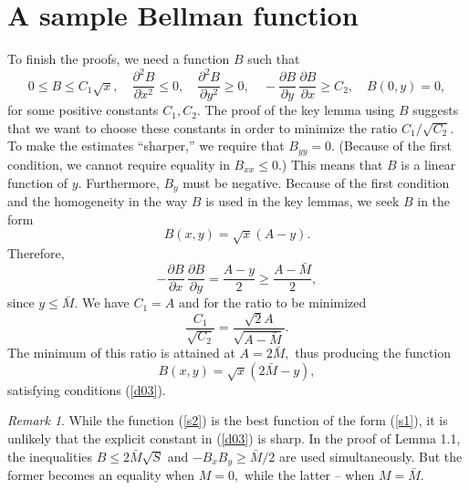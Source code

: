 \documentclass[psamsfonts]{conm-p-l}
\theoremstyle{definition}
\theoremstyle{remark}
\newtheorem{remark}[theorem]{Remark}
\numberwithin{equation}{section}
\begin{document}
\section{A sample Bellman function}
To finish the proofs, we need a function $B$ such that 
$$
0\le B\le C_1\sqrt x,\quad
\frac{\partial^2B}{\partial x^2}\le0,\quad
\frac{\partial^2B}{\partial y^2}\ge0,\quad
-\frac{\partial B}{\partial y}\,\frac{\partial B}{\partial x}\ge C_2,\quad
B(0,y)=0,
$$
for some positive constants $C_1, C_2.$ The proof of the key lemma using $B$ suggests that we want to choose these constants in order to minimize the ratio $C_1/\sqrt{C_2}.$ To make the estimates ``sharper,'' we require that
$
B_{yy}=0.
$
(Because of the first condition, we cannot require equality in $B_{xx}\le0$.) This means that $B$ is a linear function of $y.$ Furthermore, $B_y$ must be negative. Because of the first condition and the homogeneity in the way $B$ is used in the key lemmas, we seek $B$ in the form
{\begin{equation}\label{s1}{
B(x,y)=\sqrt x(A-y).
}\end{equation}}
Therefore,
$$
-\frac{\partial B}{\partial x}\,\frac{\partial B}{\partial y}=\frac{A-y}2\ge\frac{A-\bar{M}}2,
$$
since $y\le\bar{M}.$ We have $C_1=A$ and for the ratio to be minimized 
$$
\frac{C_1}{\sqrt{C_2}}=\frac{\sqrt2A}{\sqrt{A-\bar{M}}}.
$$
The minimum of this ratio is attained at $A=2\bar{M},$ thus producing the function
{\begin{equation}\label{s2}{
B(x,y)=\sqrt x(2\bar{M}-y),
}\end{equation}}
satisfying conditions (\ref{d03}).
\begin{remark}
While the function (\ref{s2}) is the best function of the form (\ref{s1}), it is unlikely that the explicit constant in (\ref{d03}) is sharp. In the proof of Lemma 1.1, the inequalities $B\le 2\bar{M}\sqrt{S}$ and $-B_xB_y\ge\bar{M}/2$ are used simultaneously. But the former becomes an equality when $M=0,$ while the latter -- when $M=\bar{M}.$ 
\end{remark}
\end{document}
